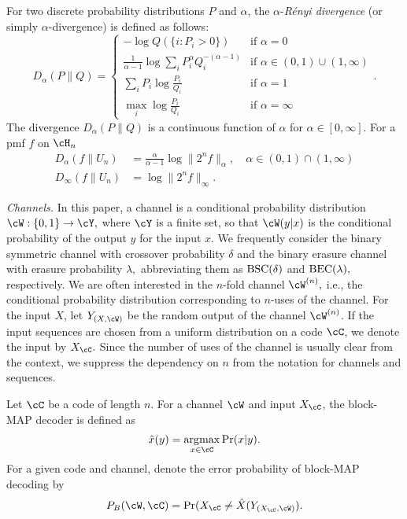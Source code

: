 \documentclass{amsart}
\theoremstyle{remark}
\DeclareMathOperator*{\argmax}{\arg\!\max}
\begin{document}
For two discrete probability distributions $P$ and $\alpha$, the $\alpha$-{\em R{\'e}nyi divergence} (or simply $\alpha$-divergence) is defined as follows:
\begin{equation}
\label{eq: Renyi div}
    D_{\alpha}(P\|Q) = 
\begin{cases}
            - \log Q(\{i:P_i>0\})  & \mbox{if } \alpha = 0 \\[.1in]
		\frac{1}{\alpha -1} \log \sum_i P_i^{\alpha} Q_i^{-(\alpha -1)}  & \mbox{if } \alpha \in (0,1) \cup (1,\infty) \\[.1in]
		\sum_i P_i\log \frac{P_i}{Q_i} & \mbox{if } \alpha =  1\\[.1in]
            \max_i \log \frac{P_i}{Q_i} & \mbox{if } \alpha =  \infty
	\end{cases}.
\end{equation}
The divergence $D_{\alpha}(P\|Q)$ is a continuous function of $\alpha$ for $\alpha \in [0,\infty]$.
For a pmf $f$ on $\cH_n$ 
\begin{align}\label{eq: Renyi smoothness}
    D_{\alpha}(f\|U_n) &=  \frac{\alpha}{\alpha -1}\log \|2^nf\|_{\alpha} , \quad \alpha \in (0,1) \cap (1,\infty)\\
    D_{\infty}(f\|U_n) &= \log\|2^nf\|_{\infty}.\label{eq: Renyi smoothness-inf}
\end{align}

\emph{Channels.} In this paper, a channel is a conditional probability distribution $\cW:\{0,1\}\to \cY,$ where $\cY$ is a finite set, so that $\cW(y|x)$ is the conditional probability of the output $y$ for the input $x$. We frequently consider the binary symmetric channel with crossover probability $\delta$ and the binary erasure channel with erasure  probability $\lambda,$
abbreviating them as ${\text{\rm BSC}}(\delta)$ and ${\text{\rm BEC}}(\lambda),$ respectively. We are often interested in the $n$-fold channel $\cW^{(n)},$ i.e., the conditional probability distribution corresponding to $n$-uses of the channel. For the input $X$, let
$Y_{(X,\cW)}$ be the random output of the channel $\cW^{(n)}$. If the input sequences are chosen from a uniform distribution on a code $\cC$, we denote the input by $X_{\cC}.$ 
Since the number of uses of the channel is usually clear from the context, we suppress the dependency on $n$ from the notation for channels and sequences.

Let $\cC$ be a code of length $n$. For a channel $\cW$ and input $X_{\cC}$, the block-MAP 
decoder is defined as 
\begin{align*}
    \hat{x}(y) = \argmax_{x \in \cC} \Pr(x|y).
\end{align*}
For a given code and channel, denote the error probability of block-MAP decoding by
\begin{align*}
    P_B(\cW, \cC) = \Pr(X_\cC \neq \hat{X}(Y_{(X_{\cC},\cW)}).
\end{align*}
\end{document}
